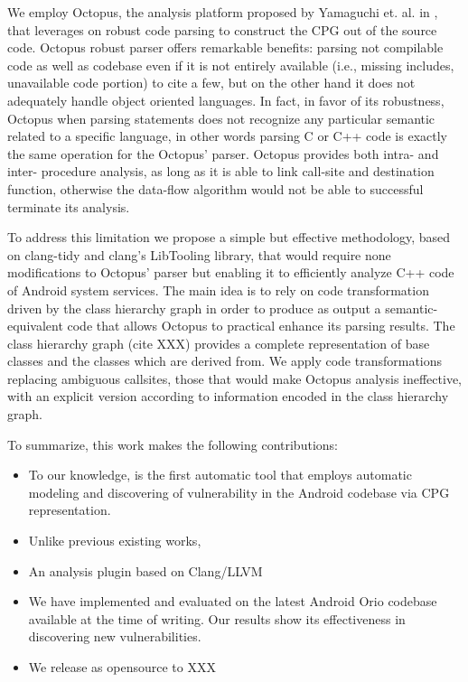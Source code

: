 We employ Octopus, the analysis platform proposed by Yamaguchi et. al. in \cite{yamaguchi2015pattern}, that leverages on robust code parsing to construct the CPG out of the source code. Octopus robust parser offers remarkable benefits: parsing not compilable code as well as codebase even if it is not entirely available (i.e., missing includes, unavailable code portion) to cite a few, but on the other hand it does not adequately handle object oriented languages. In fact, in favor of its robustness, Octopus when parsing statements does not recognize any particular semantic related to a specific language, in other words parsing C  or C++ code is exactly the same operation for the Octopus' parser. Octopus provides both intra- and inter- procedure analysis, as long as it is able to link call-site and destination function, otherwise the data-flow algorithm would not be able to successful terminate its analysis.

To address this limitation we propose a simple but effective methodology, based on clang-tidy and clang's LibTooling library, that would require none modifications to Octopus' parser but enabling it to efficiently analyze C++ code of Android system services. The main idea is to rely on code transformation driven by the class hierarchy graph in order to produce as output a semantic-equivalent code that allows Octopus to practical enhance its parsing results. The class hierarchy graph (cite XXX) provides a complete representation of base classes and the classes which are derived from. We apply code transformations replacing ambiguous callsites, those that would make Octopus analysis ineffective, with an explicit version according to information encoded in the class hierarchy graph.

To summarize, this work makes the following contributions:

\begin{itemize}
\item To our knowledge, \octo is the first automatic tool that employs automatic modeling and discovering of vulnerability in the Android codebase via CPG representation. 
\item Unlike previous existing works, \octo 
\item An analysis plugin based on Clang/LLVM
\item We have implemented and evaluated \octo on the latest Android Orio codebase available at the time of writing. Our results show its effectiveness in discovering new vulnerabilities.
\item We release \octo as opensource to XXX
\end{itemize}

